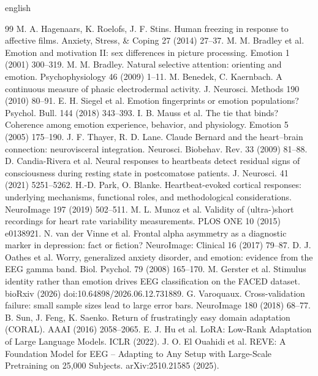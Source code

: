 \documentclass[10pt]{article}
\begin{document}
\begin{otherlanguage*}{english}
\begin{thebibliography}{99}
 M. A. Hagenaars, K. Roelofs, J. F. Stins. Human freezing in response to affective films. Anxiety, Stress, \& Coping 27 (2014) 27--37.
 M. M. Bradley et al. Emotion and motivation II: sex differences in picture processing. Emotion 1 (2001) 300--319.
 M. M. Bradley. Natural selective attention: orienting and emotion. Psychophysiology 46 (2009) 1--11.
 M. Benedek, C. Kaernbach. A continuous measure of phasic electrodermal activity. J. Neurosci. Methods 190 (2010) 80--91.
 E. H. Siegel et al. Emotion fingerprints or emotion populations? Psychol. Bull. 144 (2018) 343--393.
 I. B. Mauss et al. The tie that binds? Coherence among emotion experience, behavior, and physiology. Emotion 5 (2005) 175--190.
 J. F. Thayer, R. D. Lane. Claude Bernard and the heart--brain connection: neurovisceral integration. Neurosci. Biobehav. Rev. 33 (2009) 81--88.
 D. Candia-Rivera et al. Neural responses to heartbeats detect residual signs of consciousness during resting state in postcomatose patients. J. Neurosci. 41 (2021) 5251--5262.
 H.-D. Park, O. Blanke. Heartbeat-evoked cortical responses: underlying mechanisms, functional roles, and methodological considerations. NeuroImage 197 (2019) 502--511.
 M. L. Munoz et al. Validity of (ultra-)short recordings for heart rate variability measurements. PLOS ONE 10 (2015) e0138921.
 N. van der Vinne et al. Frontal alpha asymmetry as a diagnostic marker in depression: fact or fiction? NeuroImage: Clinical 16 (2017) 79--87.
 D. J. Oathes et al. Worry, generalized anxiety disorder, and emotion: evidence from the EEG gamma band. Biol. Psychol. 79 (2008) 165--170.
 M. Gerster et al. Stimulus identity rather than emotion drives EEG classification on the FACED dataset. bioRxiv (2026) doi:10.64898/2026.06.12.731889.
 G. Varoquaux. Cross-validation failure: small sample sizes lead to large error bars. NeuroImage 180 (2018) 68--77.
 B. Sun, J. Feng, K. Saenko. Return of frustratingly easy domain adaptation (CORAL). AAAI (2016) 2058--2065.
 E. J. Hu et al. LoRA: Low-Rank Adaptation of Large Language Models. ICLR (2022).
 J. O. El Ouahidi et al. REVE: A Foundation Model for EEG -- Adapting to Any Setup with Large-Scale Pretraining on 25,000 Subjects. arXiv:2510.21585 (2025).
\end{thebibliography}
\end{otherlanguage*}
\end{document}
